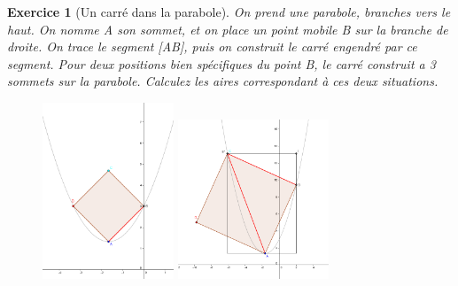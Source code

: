 \documentclass[12pt]{article}
\theoremstyle{break}
\newtheorem{exo}{Exercice}
\begin{document}
\begin{exo}[Un carré dans la parabole]
On prend une parabole, branches vers le haut. On nomme A son sommet, et on place un point mobile B sur la branche de droite. On trace le segment [AB], puis on construit le carré engendré par ce segment. Pour deux positions bien spécifiques du point B, le carré construit a 3 sommets sur la parabole. Calculez les aires correspondant à ces deux situations.


\begin{figure}[h!]
	\centering
    \includegraphics[width=0.35\textwidth]{CarreParabole.png}
    \includegraphics[width=0.4\textwidth]{CarreParabole2.png}
\end{figure}
\end{exo}
\end{document}
